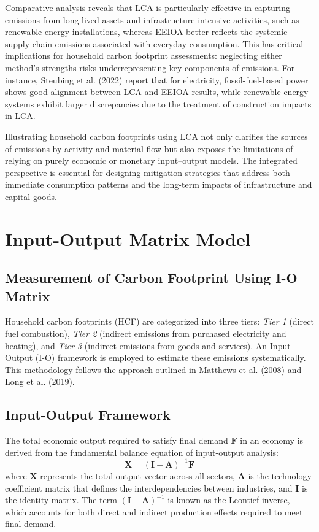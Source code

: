 \documentclass[12pt,a4paper]{article}%
\begin{document}
Comparative analysis reveals that LCA is particularly effective in capturing emissions from long-lived assets and infrastructure-intensive activities, such as renewable energy installations, whereas EEIOA better reflects the systemic supply chain emissions associated with everyday consumption. This has critical implications for household carbon footprint assessments: neglecting either method's strengths risks underrepresenting key components of emissions. For instance, Steubing et al. (2022) report that for electricity, fossil-fuel-based power shows good alignment between LCA and EEIOA results, while renewable energy systems exhibit larger discrepancies due to the treatment of construction impacts in LCA.

Illustrating household carbon footprints using LCA not only clarifies the sources of emissions by activity and material flow but also exposes the limitations of relying on purely economic or monetary input--output models. The integrated perspective is essential for designing mitigation strategies that address both immediate consumption patterns and the long-term impacts of infrastructure and capital goods.

\section{Input-Output Matrix Model}

\subsection{Measurement of Carbon Footprint Using I-O Matrix}

Household carbon footprints (HCF) are categorized into three tiers: \textit{Tier 1} (direct fuel combustion), \textit{Tier 2} (indirect emissions from purchased electricity and heating), and \textit{Tier 3} (indirect emissions from goods and services). An Input-Output (I-O) framework is employed to estimate these emissions systematically. This methodology follows the approach outlined in Matthews et al. (2008) and Long et al. (2019).

\subsection{Input-Output Framework}
The total economic output required to satisfy final demand \( \mathbf{F} \) in an economy is derived from the fundamental balance equation of input-output analysis:
\begin{equation}
    \mathbf{X} = {(\mathbf{I} - \mathbf{A})}^{-1} \mathbf{F}
\end{equation}
where \( \mathbf{X} \) represents the total output vector across all sectors, \( \mathbf{A} \) is the technology coefficient matrix that defines the interdependencies between industries, and \( \mathbf{I} \) is the identity matrix. The term \( {(\mathbf{I} - \mathbf{A})}^{-1} \) is known as the Leontief inverse, which accounts for both direct and indirect production effects required to meet final demand.
\end{document}
